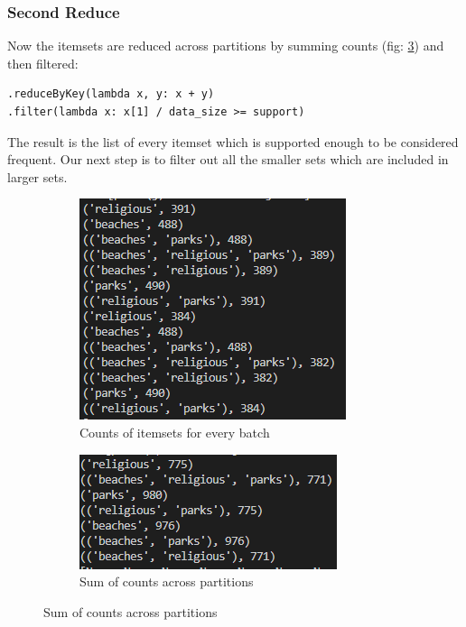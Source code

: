\documentclass[a4paper]{article}
\begin{document}
	\subsubsection{Second Reduce}
	Now the itemsets are reduced across partitions by summing counts (fig: \ref{fig:totals}) and then filtered:
	\begin{lstlisting}
.reduceByKey(lambda x, y: x + y)
.filter(lambda x: x[1] / data_size >= support)
\end{lstlisting}	
	The result is the list of every itemset which is supported enough to be considered frequent. Our next step is to filter out all the smaller sets which are included in larger sets.
	
	\begin{figure}[h]
		\centering
		
		\begin{subfigure}[b]{0.4\textwidth}
			\centering
			\includegraphics[width=\textwidth]{counts.PNG}
         	\caption{Counts of itemsets for every batch}
         	\label{fig:counts}
		\end{subfigure}
		\hfill
		\begin{subfigure}[b]{0.4\textwidth}
			\centering
			\includegraphics[width=\textwidth]{totals.PNG}
         	\caption{Sum of counts across partitions}
         	\label{fig:totals}
		\end{subfigure}
	\end{figure}
	
\end{document}
